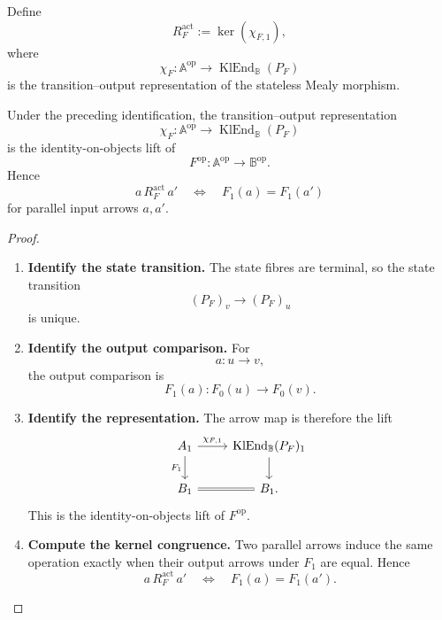 \begin{definition}
\label{def:to-stateless-action-congruence}
    Define
    \[
        R_F^{\mathrm{act}}
        :=
        \ker(\chi_{F,1}),
    \]
    where
    \[
        \chi_F:
        \mathbb A^{\mathrm{op}}
        \to
        \operatorname{KlEnd}_{\mathbb B}(P_F)
    \]
    is the transition--output representation of the stateless Mealy
    morphism.
\end{definition}

\begin{proposition}
\label{prop:to-stateless-representation}
    Under the preceding identification, the transition--output representation
    \[
        \chi_F:
        \mathbb A^{\mathrm{op}}
        \to
        \operatorname{KlEnd}_{\mathbb B}(P_F)
    \]
    is the identity-on-objects lift of
    \[
        F^{\mathrm{op}}:
        \mathbb A^{\mathrm{op}}
        \to
        \mathbb B^{\mathrm{op}}.
    \]
    Hence
    \[
        a\,R_F^{\mathrm{act}}\,a'
        \quad\Longleftrightarrow\quad
        F_1(a)=F_1(a')
    \]
    for parallel input arrows \(a,a'\).
\end{proposition}

\begin{proof}
    \leavevmode
    \begin{enumerate}
        \item \textbf{Identify the state transition.}
        The state fibres are terminal, so the state transition
        \[
            (P_F)_v\to(P_F)_u
        \]
        is unique.

        \item \textbf{Identify the output comparison.}
        For
        \[
            a:u\to v,
        \]
        the output comparison is
        \[
            F_1(a):F_0(u)\to F_0(v).
        \]

        \item \textbf{Identify the representation.}
        The arrow map is therefore the lift
        \[
        \begin{tikzcd}
            A_1
                \arrow[r, "\chi_{F,1}"]
                \arrow[d, "F_1"']
            &
            \operatorname{KlEnd}_{\mathbb B}(P_F)_1
                \arrow[d]
            \\
            B_1
                \arrow[r, equal]
            &
            B_1.
        \end{tikzcd}
        \]
        This is the identity-on-objects lift of \(F^{\mathrm{op}}\).

        \item \textbf{Compute the kernel congruence.}
        Two parallel arrows induce the same operation exactly when their
        output arrows under \(F_1\) are equal. Hence
        \[
            a\,R_F^{\mathrm{act}}\,a'
            \quad\Longleftrightarrow\quad
            F_1(a)=F_1(a').
        \]
    \end{enumerate}
\end{proof}

